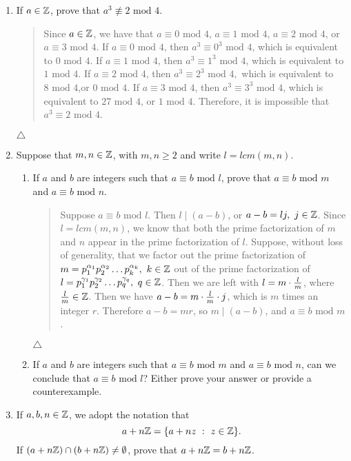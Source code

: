 \documentclass{hw}
\begin{document}
\begin{enumerate}
\item If $a\in\mathbb{Z}$, prove that $a^3\not\equiv2\text{ mod }4$.
\begin{quote}
Since $a\in\mathbb{Z}$, we have that $a\equiv0\text{ mod }4$, $a\equiv1\text{ mod }4$, $a\equiv2\text{ mod }4$, or
$a\equiv3\text{ mod }4$.
If $a\equiv0\text{ mod }4$, then $a^3\equiv0^3\text{ mod }4$, which is equivalent to $0\text{ mod }4$.
If $a\equiv1\text{ mod }4$, then $a^3\equiv1^3\text{ mod }4$, which is equivalent to $1\text{ mod }4$.
If $a\equiv2\text{ mod }4$, then $a^3\equiv2^3\text{ mod }4,$ which is equivalent to
$8\text{ mod }4$,or $0\text{ mod }4$.
If $a\equiv3\text{ mod }4$, then $a^3\equiv3^3\text{ mod }4$, which is equivalent to
$27\text{ mod }4$, or $1\text{ mod }4$.
Therefore, it is impossible that $a^3\equiv2\text{ mod }4$.
\end{quote}
$\triangle$

\item Suppose that $m,n\in\mathbb{Z}$, with $m,n\geq2$ and write $l=lcm(m,n)$.
\begin{enumerate}
\item If $a$ and $b$ are integers such that $a\equiv b\text{ mod }l$, prove that
$a\equiv b\text{ mod }m$ and $a\equiv b\text{ mod }n$.
\begin{quote}
Suppose $a\equiv b\text{ mod }l$. Then $l\mid(a-b)$, or $a-b=lj,\ j\in\mathbb{Z}$. Since $l=lcm(m,n)$, we know that
both the prime factorization of $m$ and $n$ appear in the prime factorization of $l$. Suppose, without loss
of generality, that we factor out the prime factorization of
$m=p_{1}^{\alpha_{1}}p_{2}^{\alpha_{2}}\dots p_{k}^{\alpha_{k}},\ k\in\mathbb{Z}$ out of the prime factorization of
$l = p_{1}^{\gamma_{1}}p_{2}^{\gamma_{2}}\dots p_{q}^{\gamma_{q}},\ q\in\mathbb{Z}$. Then we are left with
$l=m\cdot{l\over m}$, where ${l\over m}\in\mathbb{Z}$. Then we have $a-b=m\cdot{l\over m}\cdot j$, which is $m$
times an integer $r$. Therefore $a-b=mr$, so $m\mid(a-b)$, and $a\equiv b\text{ mod }m$.
\end{quote}
$\triangle$

\item If $a$ and $b$ are integers such that $a\equiv b\text{ mod }m$ and $a\equiv b\text{ mod }n$, can
we conclude that $a\equiv b\text{ mod }l$? Either prove your answer or provide a counterexample.
\end{enumerate}

\item If $a,b,n\in\mathbb{Z}$, we adopt the notation that
\[
a+n\ZZ = \{a+nz\ :\ z\in\ZZ\}.
\]
If $(a+n\mathbb{Z})\cap(b+n\mathbb{Z})\neq\emptyset$, prove that $a+n\mathbb{Z} = b+n\mathbb{Z}$.
\end{enumerate}
\end{document}
